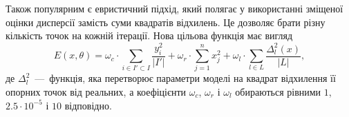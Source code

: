 Також популярним є евристичний підхід,
який полягає у використанні зміщеної оцінки дисперсії
замість суми квадратів відхилень.
Це дозволяє брати різну кількість точок на кожній ітерації.
Нова цільова функція має вигляд
\begin{equation}\label{eq:energy:face2face}
  E\left( x, \theta \right)
  = \omega_c \cdot \sum_{i \in I' \subset I} \frac{y_i^2}{\left| I' \right|}
  + \omega_r \cdot \sum_{j = 1}^{n} x_j^2
  + \omega_l \cdot \sum_{l \in L} \frac{\Delta_l^2\left( x \right)}
                                       {\left| L \right|},
\end{equation}
де $\Delta_l^2$~---~функція,
яка перетворює параметри моделі
на квадрат відхилення її опорних точок від реальних,
а коефіцієнти $\omega_c$, $\omega_r$ і $\omega_l$
обираються рівними $1$, $2.5 \cdot 10^{-5}$ і $10$ відповідно.

